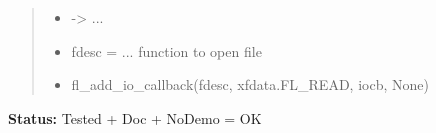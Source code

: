 \begin{boxedminipage}{\funcwidth}
\begin{quote}
\begin{itemize}
  \item {\textbar}-{\textgreater}{\textbar} ...



  \item fdesc = ... function to open file



  \item fl\_add\_io\_callback(fdesc, xfdata.FL\_READ, iocb, None)



\end{itemize}

\end{quote}

\textbf{Status:} Tested + Doc + NoDemo = OK



    \end{boxedminipage}

    \label{xformslib:flbasic:fl_remove_io_callback}

    \vspace{0.5ex}

